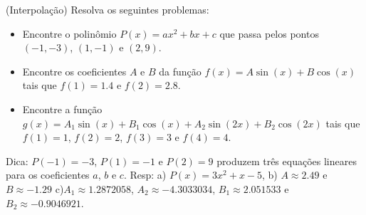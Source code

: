 \begin{exer}(Interpolação) Resolva os seguintes problemas:
\begin{itemize}
\item[a)] Encontre o polinômio $P(x)=ax^2+bx+c$ que passa pelos pontos $(-1,-3)$, $(1,-1)$ e $(2,9)$.
\item[b)] Encontre os coeficientes $A$ e $B$ da função $f(x)=A\sin(x)+B\cos(x)$ tais que $f(1)=1.4$ e $f(2)=2.8$.
\item[c)] Encontre a função $g(x)=A_1\sin(x)+B_1\cos(x) + A_2\sin(2x)+B_2\cos(2x)$ tais que $f(1)=1$, $f(2)=2$, $f(3)=3$ e $f(4)=4$.
\end{itemize}
\end{exer}
\begin{resp}
Dica: $P(-1)=-3$, $P(1)=-1$ e $P(2)=9$ produzem três equações lineares para os coeficientes $a$, $b$ e $c$.
Resp: a) $P(x)=3x^2+x-5$, b) $A\approx 2.49$ e $B\approx -1.29$ c)$A_1\approx 1.2872058$, $A_2\approx - 4.3033034$, $B_1\approx 2.051533$ e $B_2\approx - 0.9046921$.
\end{resp}
